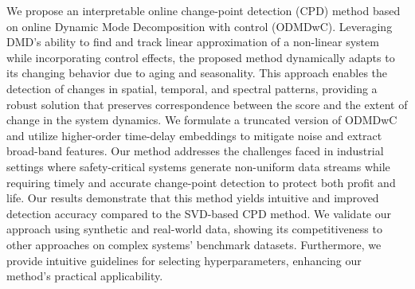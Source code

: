 We propose an interpretable online change-point detection (CPD) method based on online Dynamic Mode Decomposition with control (ODMDwC). Leveraging DMD's ability to find and track linear approximation of a non-linear system while incorporating control effects, the proposed method dynamically adapts to its changing behavior due to aging and seasonality. This approach enables the detection of changes in spatial, temporal, and spectral patterns, providing a robust solution that preserves correspondence between the score and the extent of change in the system dynamics. We formulate a truncated version of ODMDwC and utilize higher-order time-delay embeddings to mitigate noise and extract broad-band features. Our method addresses the challenges faced in industrial settings where safety-critical systems generate non-uniform data streams while requiring timely and accurate change-point detection to protect both profit and life. Our results demonstrate that this method yields intuitive and improved detection accuracy compared to the SVD-based CPD method. We validate our approach using synthetic and real-world data, showing its competitiveness to other approaches on complex systems' benchmark datasets. Furthermore, we provide intuitive guidelines for selecting hyperparameters, enhancing our method's practical applicability.

